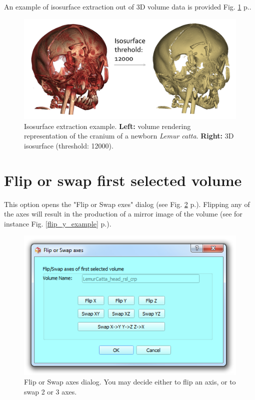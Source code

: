 An example of isosurface extraction out of 3D volume data is provided Fig. \ref{isosurface_example} p.\pageref{isosurface_example}.
\begin{figure}
  \centering
  \includegraphics[scale=0.35]{images/14/isosurface/isosurface_lemur_catta_t12000.png}
\caption{Isosurface extraction example. \textbf{Left:} volume rendering representation of the cranium of a newborn \textsl{Lemur catta}. \textbf{Right:} 3D isosurface (threshold: 12000).}	
\label{isosurface_example}
 \end{figure}




\section{Flip or swap first selected volume}
This option opens the "Flip or Swap exes" dialog (see Fig. \ref{flip_swap_dialog} p.\pageref{flip_swap_dialog}). Flipping any of the axes will result in the production of a mirror image of the volume (see for instance Fig. \ref{flip_y_example} p.\pageref{flip_y_example}).
 
\begin{figure}
  \centering
  \includegraphics[scale=0.5]{images/14/flip_swap/flip_swap_dialog.png}
\caption{Flip or Swap axes dialog. You may decide either to flip an axis, or to swap 2 or 3 axes.}	
\label{flip_swap_dialog}
 \end{figure}


